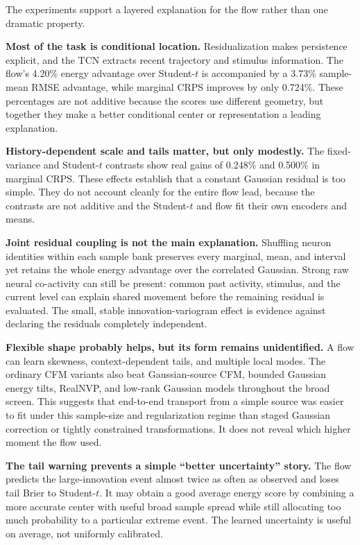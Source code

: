 \documentclass[11pt]{article}
\begin{document}
The experiments support a layered explanation for the flow rather than one dramatic property.

\textbf{Most of the task is conditional location.} Residualization makes persistence explicit, and the TCN extracts recent trajectory and stimulus information. The flow's 4.20\% energy advantage over Student-$t$ is accompanied by a 3.73\% sample-mean RMSE advantage, while marginal CRPS improves by only 0.724\%. These percentages are not additive because the scores use different geometry, but together they make a better conditional center or representation a leading explanation.

\textbf{History-dependent scale and tails matter, but only modestly.} The fixed-variance and Student-$t$ contrasts show real gains of 0.248\% and 0.500\% in marginal CRPS. These effects establish that a constant Gaussian residual is too simple. They do not account cleanly for the entire flow lead, because the contrasts are not additive and the Student-$t$ and flow fit their own encoders and means.

\textbf{Joint residual coupling is not the main explanation.} Shuffling neuron identities within each sample bank preserves every marginal, mean, and interval yet retains the whole energy advantage over the correlated Gaussian. Strong raw neural co-activity can still be present: common past activity, stimulus, and the current level can explain shared movement before the remaining residual is evaluated. The small, stable innovation-variogram effect is evidence against declaring the residuals completely independent.

\textbf{Flexible shape probably helps, but its form remains unidentified.} A flow can learn skewness, context-dependent tails, and multiple local modes. The ordinary CFM variants also beat Gaussian-source CFM, bounded Gaussian energy tilts, RealNVP, and low-rank Gaussian models throughout the broad screen. This suggests that end-to-end transport from a simple source was easier to fit under this sample-size and regularization regime than staged Gaussian correction or tightly constrained transformations. It does not reveal which higher moment the flow used.

\textbf{The tail warning prevents a simple ``better uncertainty'' story.} The flow predicts the large-innovation event almost twice as often as observed and loses tail Brier to Student-$t$. It may obtain a good average energy score by combining a more accurate center with useful broad sample spread while still allocating too much probability to a particular extreme event. The learned uncertainty is useful on average, not uniformly calibrated.
\end{document}
